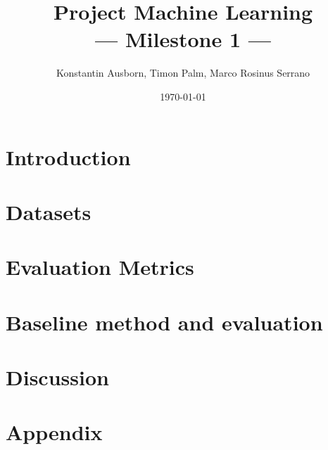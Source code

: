\documentclass[10pt,a4paper,twoside]{article}
\title{Project Machine Learning\\--- Milestone 1 ---}
\author{Konstantin Ausborn, Timon Palm, Marco Rosinus Serrano}
\date{\today}
\begin{document}
    \maketitle
    \section{Introduction}\label{sec:introduction}
    
    \section{Datasets}\label{sec:datasets}
    
    \section{Evaluation Metrics}\label{sec:evaluation-metrics}
    
    \section{Baseline method and evaluation}\label{sec:baseline-method-and-evaluation}
    
    \section{Discussion}\label{sec:discussion}
    
    
    \section{Appendix}\label{sec:appendix}
    
\end{document}
